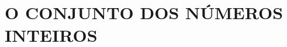 \documentclass[../main.tex]{subfiles}
\begin{document}
\chapter{O CONJUNTO DOS NÚMEROS INTEIROS}
\end{document}
